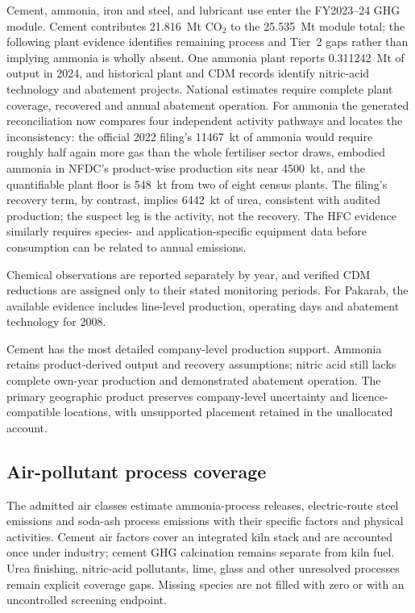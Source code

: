 Cement, ammonia, iron and steel, and lubricant use enter the FY2023--24 GHG module. Cement contributes \SI{21.816}{\mega\tonne} CO$_2$ to the \SI{25.535}{\mega\tonne} module total; the following plant evidence identifies remaining process and Tier~2 gaps rather than implying ammonia is wholly absent. One ammonia plant reports
\SI{0.311242}{\mega\tonne} of output in 2024, and historical plant and CDM records identify
nitric-acid technology and abatement projects. National estimates require complete plant
coverage, recovered \COtwo{} and annual abatement operation. For ammonia the generated
reconciliation now compares four independent activity pathways and locates the
inconsistency: the official 2022 filing's \SI{11467}{\kilo\tonne} of ammonia would require
roughly half again more gas than the whole fertiliser sector draws, embodied ammonia in
NFDC's product-wise production sits near \SI{4500}{\kilo\tonne}, and the quantifiable plant
floor is \SI{548}{\kilo\tonne} from two of eight census plants. The filing's recovery term,
by contrast, implies \SI{6442}{\kilo\tonne} of urea, consistent with audited production;
the suspect leg is the activity, not the recovery. The HFC evidence similarly
requires species- and application-specific equipment data before consumption can be related to
annual emissions.

Chemical observations are reported separately by year, and verified CDM reductions are
assigned only to their stated monitoring periods. For Pakarab, the available evidence includes
line-level production, operating days and abatement technology for 2008.

Cement has the most detailed company-level production support. Ammonia retains product-derived output and recovery assumptions; nitric acid still lacks complete own-year production and demonstrated abatement operation. The primary geographic product preserves company-level uncertainty and licence-compatible locations, with unsupported placement retained in the unallocated account.

\subsection{Air-pollutant process coverage}
The admitted air classes estimate ammonia-process releases, electric-route steel emissions and soda-ash process emissions with their specific factors and physical activities. Cement air factors cover an integrated kiln stack and are accounted once under industry; cement GHG calcination remains separate from kiln fuel. Urea finishing, nitric-acid pollutants, lime, glass and other unresolved processes remain explicit coverage gaps. Missing species are not filled with zero or with an uncontrolled screening endpoint.

